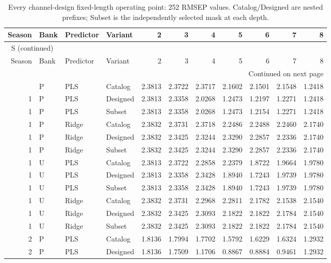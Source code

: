 \documentclass[10pt,a4paper]{article}
\renewcommand{\thetable}{S\arabic{table}}
\begin{document}
\begingroup\footnotesize
\setlength{\tabcolsep}{3.5pt}
\renewcommand{\arraystretch}{1.10}
\begin{longtable}{rlllrrrrrrr}
\caption{Every channel-design fixed-length operating point: 252 RMSEP values. Catalog/Designed are nested prefixes; Subset is the independently selected mask at each depth.}\label{tab:v3fixed}\\
\toprule
Season & Bank & Predictor & Variant & 2 & 3 & 4 & 5 & 6 & 7 & 8 \\
\midrule
\endfirsthead
\multicolumn{11}{l}{\tablename~\thetable{} (continued)}\\
\toprule
Season & Bank & Predictor & Variant & 2 & 3 & 4 & 5 & 6 & 7 & 8 \\
\midrule
\endhead
\midrule
\multicolumn{11}{r}{Continued on next page}\\
\endfoot
\bottomrule
\endlastfoot
1 & P & PLS & Catalog & 2.3813 & 2.3722 & 2.3717 & 2.1602 & 2.1501 & 2.1548 & 1.2418 \\
1 & P & PLS & Designed & 2.3813 & 2.3358 & 2.0268 & 1.2473 & 1.2197 & 1.2271 & 1.2418 \\
1 & P & PLS & Subset & 2.3813 & 2.3358 & 2.0268 & 1.2473 & 1.2154 & 1.2271 & 1.2418 \\
1 & P & Ridge & Catalog & 2.3832 & 2.3731 & 2.3718 & 2.2486 & 2.2488 & 2.2460 & 2.1740 \\
1 & P & Ridge & Designed & 2.3832 & 2.3425 & 2.3244 & 2.3290 & 2.2857 & 2.2336 & 2.1740 \\
1 & P & Ridge & Subset & 2.3832 & 2.3425 & 2.3244 & 2.3290 & 2.2857 & 2.2336 & 2.1740 \\
1 & U & PLS & Catalog & 2.3813 & 2.3722 & 2.2858 & 2.2379 & 1.8722 & 1.9664 & 1.9780 \\
1 & U & PLS & Designed & 2.3813 & 2.3358 & 2.3428 & 1.8940 & 1.7243 & 1.9739 & 1.9780 \\
1 & U & PLS & Subset & 2.3813 & 2.3358 & 2.3428 & 1.8940 & 1.7243 & 1.9739 & 1.9780 \\
1 & U & Ridge & Catalog & 2.3832 & 2.3731 & 2.2968 & 2.2811 & 2.1782 & 2.1538 & 2.1540 \\
1 & U & Ridge & Designed & 2.3832 & 2.3425 & 2.3093 & 2.1822 & 2.1822 & 2.1784 & 2.1540 \\
1 & U & Ridge & Subset & 2.3832 & 2.3425 & 2.3093 & 2.1822 & 2.1822 & 2.1784 & 2.1540 \\
2 & P & PLS & Catalog & 1.8136 & 1.7994 & 1.7702 & 1.5792 & 1.6229 & 1.6324 & 1.2932 \\
2 & P & PLS & Designed & 1.8136 & 1.7509 & 1.1706 & 0.8867 & 0.8884 & 0.9461 & 1.2932 \\

\end{longtable}
\end{document}
